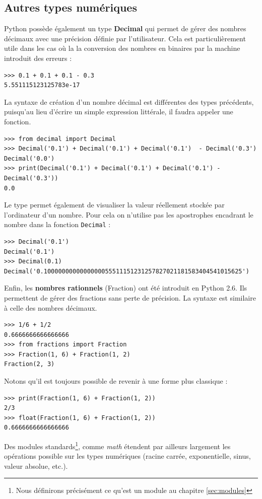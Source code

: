 \documentclass[12pt, a4paper]{article}
\begin{document}
\subsection{Autres types numériques}
Python possède également un type \textbf{Decimal} qui permet de gérer des nombres décimaux avec une précision définie par l'utilisateur. Cela est particulièrement utile dans les cas où la la conversion des nombres en binaires par la machine introduit des erreurs :
\begin{lstlisting}
>>> 0.1 + 0.1 + 0.1 - 0.3
5.551115123125783e-17
\end{lstlisting}

La syntaxe de création d'un nombre décimal est différentes des types précédents, puisqu'au lieu d'écrire un simple expression littérale, il faudra appeler une fonction.
\begin{lstlisting}
>>> from decimal import Decimal
>>> Decimal('0.1') + Decimal('0.1') + Decimal('0.1')  - Decimal('0.3')
Decimal('0.0')
>>> print(Decimal('0.1') + Decimal('0.1') + Decimal('0.1') - Decimal('0.3'))
0.0
\end{lstlisting}

Le type permet également de visualiser la valeur réellement stockée par l'ordinateur d'un nombre. Pour cela on n'utilise pas les apostrophes encadrant le nombre dans la fonction \lstinline{Decimal} :
\begin{lstlisting}
>>> Decimal('0.1')
Decimal('0.1')
>>> Decimal(0.1)
Decimal('0.1000000000000000055511151231257827021181583404541015625')
\end{lstlisting}

Enfin, les \textbf{nombres rationnels} (Fraction) ont été introduit en Python 2.6. Ils permettent de gérer des fractions sans perte de précision. La syntaxe est similaire à celle des nombres décimaux.
\begin{lstlisting}
>>> 1/6 + 1/2
0.6666666666666666
>>> from fractions import Fraction
>>> Fraction(1, 6) + Fraction(1, 2)
Fraction(2, 3)
\end{lstlisting}

Notons qu'il est toujours possible de revenir à une forme plus classique :
\begin{lstlisting}
>>> print(Fraction(1, 6) + Fraction(1, 2))
2/3
>>> float(Fraction(1, 6) + Fraction(1, 2))
0.6666666666666666
\end{lstlisting}

Des modules standards\footnote{Nous définirons précisément ce qu'est un module au chapitre \ref{sec:modules}}, comme \textit{math} étendent par ailleurs largement les opérations possible sur les types numériques (racine carrée, exponentielle, sinus, valeur absolue, etc.).
\end{document}

